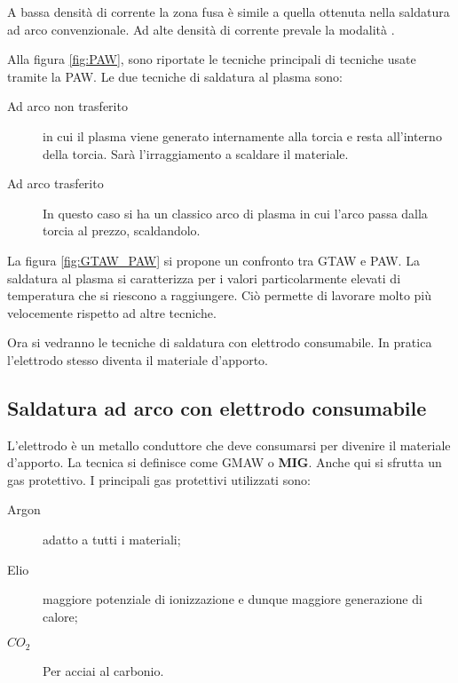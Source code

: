 \begin{figure}
\centering
{}\quad
{}
\end{figure}

A bassa densità di corrente la zona fusa è simile a quella ottenuta nella saldatura ad arco convenzionale.
Ad alte densità di corrente prevale la modalità .

Alla figura \ref{fig:PAW}, sono riportate le tecniche principali di tecniche usate tramite la \ac{PAW}.
Le due tecniche di saldatura al plasma sono:
\begin{description}
\item[Ad arco non trasferito] in cui il plasma viene generato internamente alla torcia e resta all'interno della torcia. Sarà l'irraggiamento a scaldare il materiale.
\item[Ad arco trasferito] In questo caso si ha un classico arco di plasma in cui l'arco passa dalla torcia al prezzo, scaldandolo.
\end{description}

La figura \ref{fig:GTAW_PAW} si propone un confronto tra \ac{GTAW} e \ac{PAW}.
La saldatura al plasma si caratterizza per i valori particolarmente elevati di temperatura che si riescono a raggiungere. Ciò permette di lavorare molto più velocemente rispetto ad altre tecniche.

Ora si vedranno le tecniche di saldatura con elettrodo consumabile.
In pratica l'elettrodo stesso diventa il materiale d'apporto.

\subsection{Saldatura ad arco con elettrodo consumabile}
L'elettrodo è un metallo conduttore che deve consumarsi per divenire il materiale d'apporto.
La tecnica si definisce come \ac{GMAW} o \textbf{MIG}. 
Anche qui si sfrutta un gas protettivo.
I principali gas protettivi utilizzati sono:
\begin{description}
\item[Argon] adatto a tutti i materiali;
\item[Elio] maggiore potenziale di ionizzazione e dunque maggiore generazione di calore;
\item[$CO_2$] Per acciai al carbonio.
\end{description}

